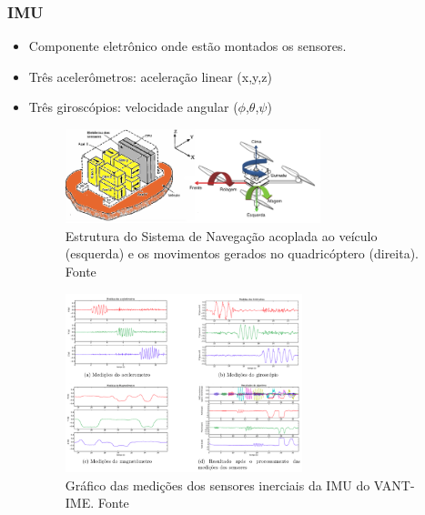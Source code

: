 \documentclass{beamer}
\begin{document}
\begin{frame}[allowframebreaks]
	\frametitle{IMU}
	
	\begin{itemize}
		
		\item Componente eletrônico onde estão montados os sensores. 
		
		\item Três acelerômetros: aceleração linear (x,y,z)
		
		\item Três giroscópios: velocidade angular ($\phi$,$\theta$,$\psi$)
	
	    \vspace{1cm}
	
		\begin{figure}[h]
			\centering
			\includegraphics[keepaspectratio = true,
			width=0.7\textwidth]{img/imuStrap.png}
			\caption{Estrutura do Sistema de Navegação acoplada ao veículo (esquerda) e os movimentos gerados no quadricóptero (direita). Fonte \cite{Adalberto2009}}
			\label{fig:imuStrap}
		\end{figure}
		
	\framebreak
	
		\begin{figure}
			\centering
			\includegraphics[keepaspectratio = true,
			width=0.65\textwidth]{img/imu_VANTIME.png}
			\caption{Gráfico das medições dos sensores inerciais da IMU do VANT-IME. Fonte \cite{Paixao2011}}
			\label{fig:imuVANTIME}
		\end{figure}
	
	\end{itemize}
\end{frame}	
\end{document}
